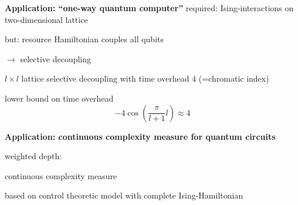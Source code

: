\documentclass[portrait]{seminar}
\begin{document}
\begin{slide}
{\bf Application: ``one-way quantum computer''}
\vfill
required: Ising-interactions on two-dimensional lattice

but: resource Hamiltonian couples all qubits

$\rightarrow$ selective decoupling
\vfill
{}\textwidth{}

$l\times l$ lattice
\vfill
selective decoupling with time overhead $4$ (=chromatic index)

lower bound on time overhead
\[
-4\cos\left( \frac{\pi}{l+1}l \right)\approx 4
\]
\vfill
\end{slide}

\begin{slide}
{\bf Application: continuous complexity measure for quantum circuits}
\medskip

weighted depth:

continuous complexity measure

based on control theoretic model with complete Ising-Hamiltonian


\end{slide}
\end{document}
